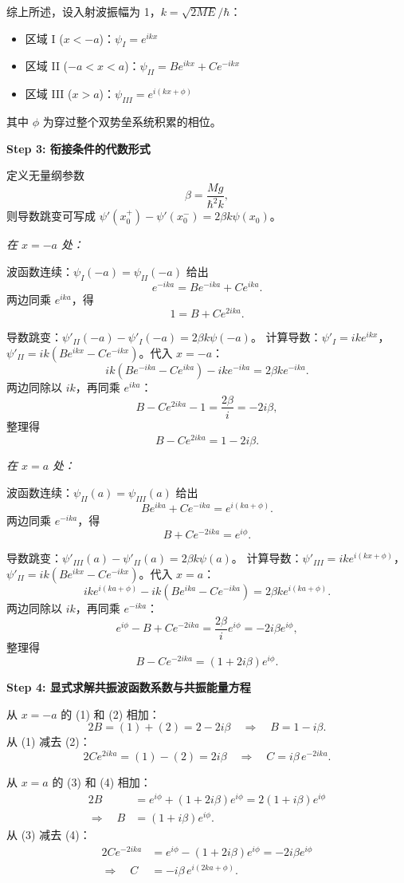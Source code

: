 \begin{derivationbox}[标准解题过程]
综上所述，设入射波振幅为 1，$k=\sqrt{2ME}/\hbar$：
\begin{itemize}[nosep]
    \item 区域 I ($x<-a$)：$\psi_I = e^{ikx}$
    \item 区域 II ($-a<x<a$)：$\psi_{II} = Be^{ikx} + Ce^{-ikx}$
    \item 区域 III ($x>a$)：$\psi_{III} = e^{i(kx+\phi)}$
\end{itemize}
其中 $\phi$ 为穿过整个双势垒系统积累的相位。

\textbf{Step 3: 衔接条件的代数形式}

定义无量纲参数
\[
\beta = \frac{Mg}{\hbar^2 k},
\]
则导数跳变可写成 $\psi'(x_0^+) - \psi'(x_0^-) = 2\beta k \psi(x_0)$。

\textit{在 $x=-a$ 处：}

波函数连续：$\psi_I(-a) = \psi_{II}(-a)$ 给出
\[
e^{-ika} = B e^{-ika} + C e^{ika}.
\]
两边同乘 $e^{ika}$，得
\[
1 = B + Ce^{2ika}. \tag{1}
\]

导数跳变：$\psi'_{II}(-a) - \psi'_I(-a) = 2\beta k \psi(-a)$。
计算导数：$\psi'_I = ik e^{ikx}$，$\psi'_{II} = ik(Be^{ikx} - Ce^{-ikx})$。代入 $x=-a$：
\[
ik(Be^{-ika} - Ce^{ika}) - ik e^{-ika} = 2\beta k e^{-ika}.
\]
两边同除以 $ik$，再同乘 $e^{ika}$：
\[
B - Ce^{2ika} - 1 = \frac{2\beta}{i} = -2i\beta,
\]
整理得
\[
B - Ce^{2ika} = 1 - 2i\beta. \tag{2}
\]

\textit{在 $x=a$ 处：}

波函数连续：$\psi_{II}(a) = \psi_{III}(a)$ 给出
\[
Be^{ika} + Ce^{-ika} = e^{i(ka+\phi)}.
\]
两边同乘 $e^{-ika}$，得
\[
B + Ce^{-2ika} = e^{i\phi}. \tag{3}
\]

导数跳变：$\psi'_{III}(a) - \psi'_{II}(a) = 2\beta k \psi(a)$。
计算导数：$\psi'_{III} = ik e^{i(kx+\phi)}$，$\psi'_{II} = ik(Be^{ikx} - Ce^{-ikx})$。代入 $x=a$：
\[
ik e^{i(ka+\phi)} - ik(Be^{ika} - Ce^{-ika}) = 2\beta k e^{i(ka+\phi)}.
\]
两边同除以 $ik$，再同乘 $e^{-ika}$：
\[
e^{i\phi} - B + Ce^{-2ika} = \frac{2\beta}{i} e^{i\phi} = -2i\beta e^{i\phi},
\]
整理得
\[
B - Ce^{-2ika} = (1+2i\beta)e^{i\phi}. \tag{4}
\]

\textbf{Step 4: 显式求解共振波函数系数与共振能量方程}

从 $x=-a$ 的 (1) 和 (2) 相加：
\[
2B = (1) + (2) = 2 - 2i\beta \quad\Longrightarrow\quad \boxed{B = 1 - i\beta}.
\]
从 (1) 减去 (2)：
\[
2Ce^{2ika} = (1) - (2) = 2i\beta \quad\Longrightarrow\quad \boxed{C = i\beta\,e^{-2ika}}.
\]

从 $x=a$ 的 (3) 和 (4) 相加：
\begin{align*}
2B &= e^{i\phi} + (1+2i\beta)e^{i\phi} = 2(1+i\beta)e^{i\phi} \\
\Longrightarrow\quad B &= (1+i\beta)e^{i\phi}.
\end{align*}
从 (3) 减去 (4)：
\begin{align*}
2Ce^{-2ika} &= e^{i\phi} - (1+2i\beta)e^{i\phi} = -2i\beta e^{i\phi} \\
\Longrightarrow\quad C &= -i\beta\,e^{i(2ka+\phi)}.
\end{align*}


\end{derivationbox}
